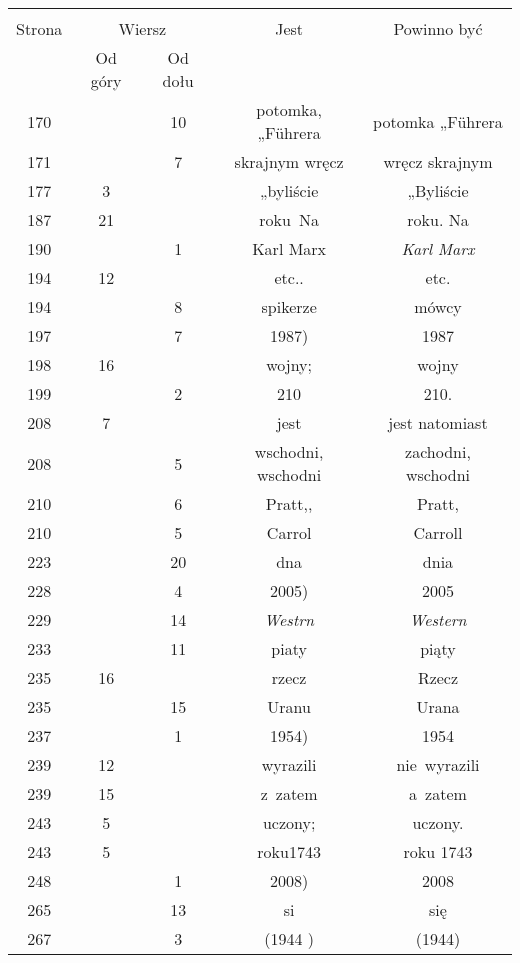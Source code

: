 \documentclass[a4paper,11pt]{article}
\begin{document}
\begin{center}
  \begin{tabular}{|c|c|c|c|c|}
    \hline
    & \multicolumn{2}{c|}{} & & \\
    Strona & \multicolumn{2}{c|}{Wiersz} & Jest
                              & Powinno być \\ \cline{2-3}
    & Od góry & Od dołu & & \\
    \hline
    170 & & 10 & potomka, „F\"{u}hrera & potomka „F\"{u}hrera \\
    171 & &  7 & skrajnym wręcz & wręcz skrajnym \\
    177 &  3 & & „byliście & „Byliście \\
    187 & 21 & & roku~Na & roku. Na \\
    190 & &  1 & Karl Marx & \textit{Karl Marx} \\
    194 & 12 & & etc.. & etc. \\
    194 & &  8 & spikerze & mówcy \\
    197 & &  7 & 1987) & 1987 \\
    198 & 16 & & wojny; & wojny \\
    199 & &  2 & 210 & 210. \\
    208 &  7 & & jest & jest natomiast \\
    208 & &  5 & wschodni, wschodni & zachodni, wschodni \\
    210 & &  6 & Pratt,, & Pratt, \\
    210 & &  5 & Carrol & Carroll \\
    223 & & 20 & dna & dnia \\
    228 & &  4 & 2005) & 2005 \\
    229 & & 14 & \textit{Westrn} & \textit{Western} \\
    233 & & 11 & piaty & piąty \\
    235 & 16 & & rzecz & Rzecz \\
    235 & & 15 & Uranu & Urana \\
    237 & &  1 & 1954) & 1954 \\
    239 & 12 & & wyrazili & nie~wyrazili \\
    239 & 15 & & z~zatem & a~zatem \\
    243 &  5 & & uczony; & uczony. \\
    243 &  5 & & roku1743 & roku 1743 \\
    248 & &  1 & 2008) & 2008 \\
    265 & & 13 & si & się \\
    267 & &  3 & (1944 ) & (1944) \\

\end{tabular}
\end{center}
\end{document}
